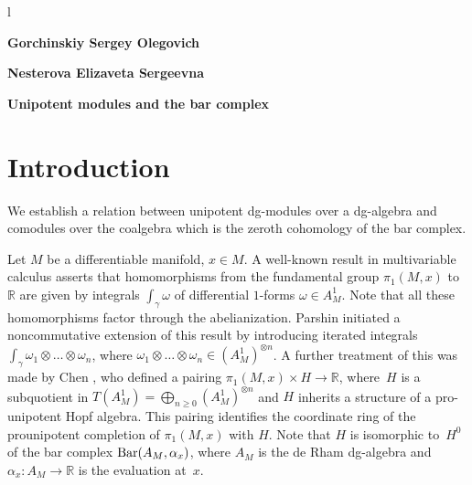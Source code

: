 \documentclass[10pt,russian]{article}
\theoremstyle{plain}
\theoremstyle{definition}
\newcommand{\Barr}{{\rm Bar}}
\begin{document}
	

	\begin{abstract}
		
		Let $M$ be a differentiable manifold, $x \in M$. Chen identified the coordinate ring of the prounipotent completion of $\pi_1(M,x)$ with $H^0$ of a certain complex associated to the de Rham algebra of $M$, and iterated integrals as a map from $\pi_1(M,x)$ to this $H^0$. \par
		The goal of this work lies in giving a general treatment of Chen's result for an arbitrary augmented connected differential graded algebra.
		
	\end{abstract}
	
	\begin{center}l
		
		\textbf{\large Gorchinskiy Sergey Olegovich}
		
		
		\textbf{\large Nesterova Elizaveta Sergeevna}
		
		\vspace{1.5cm}
		
		{\Large\bfseries
			Unipotent modules and the bar complex
			\par}
		
		\vspace{1.5cm}
		
	\end{center}
	\thispagestyle{empty}
	\pagebreak
	
	
\section{Introduction}
	
We establish a relation between unipotent dg-modules over a \mbox{dg-algebra} and comodules over the coalgebra which is the zeroth cohomology of the bar complex.

\medskip

Let $M$ be a differentiable manifold, $x \in M$. A well-known result in multivariable calculus asserts that homomorphisms from the fundamental group $\pi_1(M,x)$ to $\mathbb R$ are given by integrals $\int_{\gamma} \omega$ of differential \mbox{$1$-forms} $\omega \in A_M^1$. Note that all these homomorphisms factor through the abelianization.
	Parshin \cite{Par} initiated a noncommutative extension of this result by introducing iterated integrals $\int_{\gamma} \omega_1 \otimes \ldots \otimes \omega_n$, where $\omega_1 \otimes \ldots \otimes \omega_n \in (A^1_M)^{\otimes n}$. A further treatment of this was made by Chen \cite{Chen}, who defined a pairing $\pi_1(M, x) \times  H \to \mathbb R$, where~$H$ is a subquotient in $T(A^1_ M) =\bigoplus_{n\geqslant 0}(A^1_M)^{\otimes n}$ and $H$ inherits a structure of a pro-unipotent Hopf algebra.
	This pairing identifies the coordinate ring of the prounipotent completion of $\pi_1(M, x)$ with $H$.
	Note that $H$ is isomorphic to~$H^0$ of the bar complex $\Barr(A_M, \alpha_x)$, where $A_M$ is the de Rham dg-algebra and $\alpha_x \colon A_M \to \mathbb R$ is the evaluation at~$x$.
	
\end{document}
